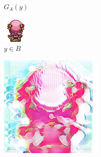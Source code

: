 \documentclass[twocolumn,11pt]{ctexart}
\begin{document}
\begin{figure}[htb]
\begin{subfigure}[b]{0.23\linewidth}
        \caption{$G_A(y)$}
      \end{subfigure}
      \begin{subfigure}[b]{0.23\linewidth}
        \includegraphics[width=\linewidth]{exp7_epoch061_real_B.png}
        \caption{$y \in B$}
      \end{subfigure}
      \begin{subfigure}[b]{0.23\linewidth}
        \includegraphics[width=\linewidth]{exp7_epoch061_fake_A.png}

\end{subfigure}
\end{figure}
\end{document}
